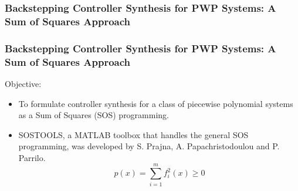 \documentclass{beamer}
\newcommand{\green}{\color[rgb]{0,0.79,0}}
\newcommand{\beq}{\begin{equation*}}
\newcommand{\eeq}{\end{equation*}}
\begin{document}
  \frame
  {
    \frametitle{Backstepping Controller Synthesis for PWP Systems: A Sum of Squares Approach}
    \centerline{}
  }

  \frame
  {
    \frametitle{Backstepping Controller Synthesis for PWP Systems: A Sum of Squares Approach}
    
    Objective:
    \begin{itemize}
    \item<1-> To formulate controller synthesis for a class of piecewise polynomial systems as a {\green Sum of Squares (SOS)} programming.
\item<2-> SOSTOOLS, a MATLAB toolbox that handles the general SOS programming, was developed by S. Prajna, A. Papachristodoulou and P. Parrilo. 
    \beq
		p(x) = \sum_{i=1}^m f_i^2(x) \geq 0
		\eeq
\end{itemize}
}
\end{document}
